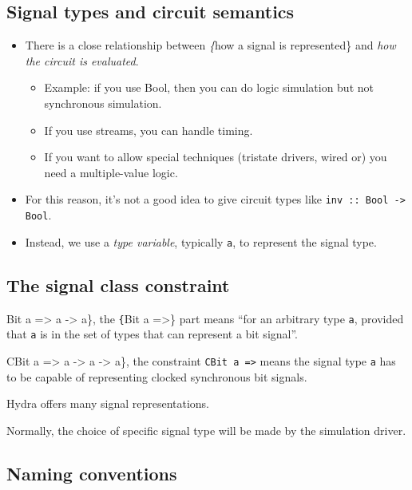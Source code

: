 \documentclass[]{svmono}
\begin{document}
\subsection*{Signal types and circuit semantics}
\label{sec:orgfa1318f}

\begin{itemize}
\item There is a close relationship between \emph\{how a signal is
represented\} and \emph{how the circuit is evaluated}.
\begin{itemize}
\item Example: if you use Bool, then you can do logic simulation but
not synchronous simulation.
\item If you use streams, you can handle timing.
\item If you want to allow special techniques (tristate drivers,
wired or) you need a multiple-value logic.
\end{itemize}

\item For this reason, it's not a good idea to give circuit types like
\texttt{inv :: Bool -> Bool}.
\item Instead, we use a \emph{type variable}, typically \texttt{a}, to
represent the signal type.
\end{itemize}
\subsection*{The signal class constraint}
\label{sec:org5a60f6b}

\begin{description}
\item[{When you write \texttt\{inv}] Bit a => a -> a\}, the \texttt\{Bit
a =>\} part means ``for an arbitrary type \texttt{a}, provided
that \texttt{a} is in the set of types that can represent a bit
signal''.
\item[{Similarly, \texttt\{reg1}] CBit a => a -> a -> a\}, the
constraint \texttt{CBit a =>} means the signal type \texttt{a}
has to be capable of representing clocked synchronous bit
signals.
\item Hydra offers many signal representations.
\item Normally, the choice of specific signal type will be made by the
simulation driver.
\end{description}
\subsection*{Naming conventions}
\label{sec:orgf683c1c}
\end{document}
